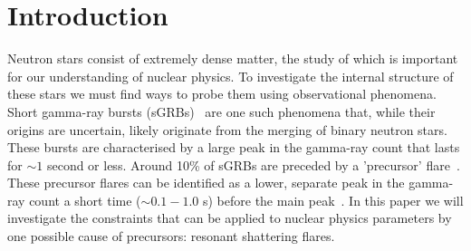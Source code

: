 \documentclass[fleqn,usenatbib]{mnras}
\begin{document}



 


\section{Introduction}
\hspace{\parindent}Neutron stars consist of extremely dense matter, the study of which is important for our understanding of nuclear physics. To investigate the internal structure of these stars we must find ways to probe them using observational phenomena. Short gamma-ray bursts (sGRBs)~\citet{d2015short} are one such phenomena that, while their origins are uncertain, likely originate from the merging of binary neutron stars. These bursts are characterised by a large peak in the gamma-ray count that lasts for $\sim 1$ second or less. Around 10\% of sGRBs are preceded by a 'precursor' flare~\citet{troja2010precursors}. These precursor flares can be identified as a lower, separate peak in the gamma-ray count a short time ($\sim 0.1-1.0$ s) before the main peak~\citet{zhong2019precursors}. In this paper we will investigate the constraints that can be applied to nuclear physics parameters by one possible cause of precursors: resonant shattering flares.
\end{document}
